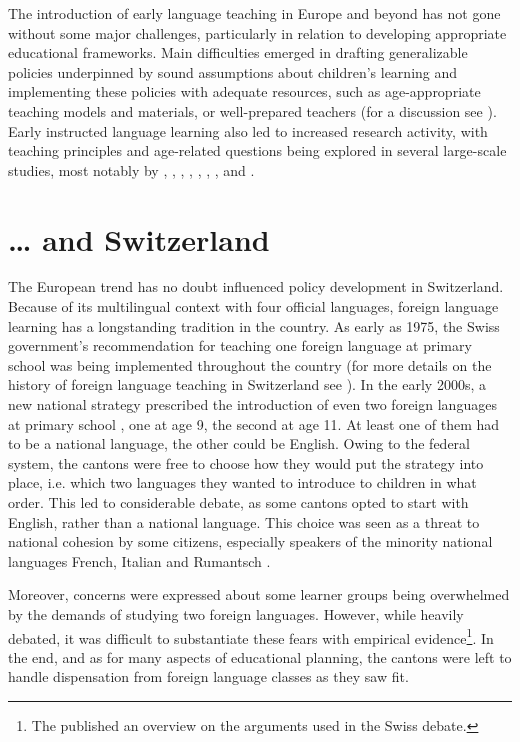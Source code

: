 \documentclass[output=paper]{langsci/langscibook}
\begin{document}
The introduction of early language teaching in Europe and beyond has not gone without some major challenges, particularly in relation to developing appropriate educational frameworks. Main difficulties emerged in drafting generalizable policies underpinned by sound assumptions about children’s learning \citep{Johnstone2009} and implementing these policies with adequate resources, such as age-appropriate teaching models and materials, or well-prepared teachers (for a discussion see \citealt{GartonEtAl2011}). Early instructed language learning also led to increased research activity, with teaching principles and age-related questions being explored in several large-scale studies, most notably by \citet{EdelenbosEtAl2006}, \citet{Muñoz2006}, \citet{NikolovCsapó2010}, \citet{Enever2011}, \citet{GartonEtAl2011}, \citet{Pfenninger2016}, \citet{JaekelEtAl2017}, and \citet{BaumertEtAl2020}.

\section{… and Switzerland}

The European trend has no doubt influenced policy development in Switzerland. Because of its multilingual context with four official languages, foreign language learning has a longstanding tradition in the country. As early as 1975, the Swiss government’s recommendation for teaching one foreign language at primary school was being implemented throughout the country (for more details on the history of foreign language teaching in Switzerland see \citealt{GiudiciGrizelj2016}). In the early 2000s, a new national strategy prescribed the introduction of even two foreign languages at primary school \citep{EDK2004}, one at age 9, the second at age 11. At least one of them had to be a national language, the other could be English. Owing to the federal system, the cantons were free to choose how they would put the strategy into place, i.e. which two languages they wanted to introduce to children in what order. This led to considerable debate, as some cantons opted to start with English, rather than a national language. This choice was seen as a threat to national cohesion by some citizens, especially speakers of the minority national languages French, Italian and Rumantsch \citep{Stotz2006}.

Moreover, concerns were expressed about some learner groups being overwhelmed by the demands of studying two foreign languages. However, while heavily debated, it was difficult to substantiate these fears with empirical evidence\footnote{The \citet{SchweizerischeAkademiederGeisteswissenschaften2015} published an overview on the arguments used in the Swiss debate.}. In the end, and as for many aspects of educational planning, the cantons were left to handle dispensation from foreign language classes as they saw fit.
\end{document}
